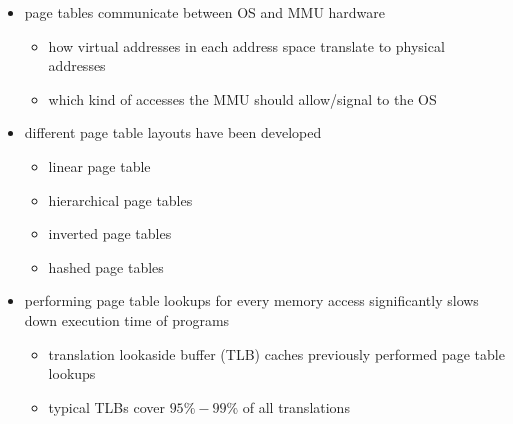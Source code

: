 \begin{summary}
  \begin{itemize}
    \item page tables communicate between OS and MMU hardware
    \begin{itemize}
      \item how virtual addresses in each address space translate to physical addresses
      \item which kind of accesses the MMU should allow/signal to the OS
    \end{itemize}
    \item different page table layouts have been developed
    \begin{itemize}
      \item linear page table
      \item hierarchical page tables
      \item inverted page tables
      \item hashed page tables
    \end{itemize}
    \item performing page table lookups for every memory access significantly slows down execution time of programs
    \begin{itemize}
      \item translation lookaside buffer (TLB) caches previously performed page table lookups
      \item typical TLBs cover $ 95\%-99\% $ of all translations
    \end{itemize}
  \end{itemize}
\end{summary}